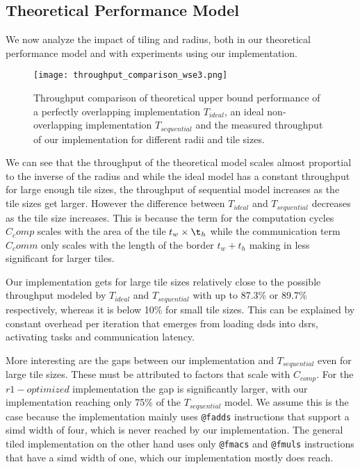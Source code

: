 \subsection{Theoretical Performance Model}
\label{sec:c}
We now analyze the impact of tiling and radius, both in our theoretical performance model and with experiments using our implementation.
\begin{figure}[h]
    \centering
    \texttt{[image: throughput\_comparison\_wse3.png]}
    \caption{Throughput comparison of theoretical upper bound performance of a perfectly overlapping implementation $T_{ideal}$, an ideal non-overlapping implementation $T_{sequential}$ and the measured throughput of our implementation for different radii and tile sizes.}
    \label{fig:throughput_comparison_wse3}
\end{figure}
We can see that the throughput of the theoretical model scales almost proportial to the inverse of the radius and while the ideal model has a constant throughput for large enough tile sizes, the throughput of sequential model increases as the tile sizes get larger.
However the difference between $T_{ideal}$ and $T_{sequential}$ decreases as the tile size increases. This is because the term for the computation cycles $C_comp$ scales with the area of the tile $t_w\times\t_h$ while the communication term $C_comm$ only scales with the length of the border $t_w+t_h$ making in less significant for larger tiles.

Our implementation gets for large tile sizes relatively close to the possible throughput modeled by $T_{ideal}$ and $T_{sequential}$ with up to 87.3\% or 89.7\% respectively, whereas it is below 10\% for small tile sizes. This can be explained by constant overhead per iteration that emerges from loading \acp{dsd} into \acp{dsr}, activating tasks and communication latency.


More interesting are the gaps between our implementation and $T_{sequential}$ even for large tile sizes. These must be attributed to factors that scale with $C_{comp}$. For the $r1-optimized$ implementation the gap is significantly larger, with our implementation reaching only 75\% of the $T_{sequential}$ model. We assume this is the case because the implementation mainly uses \texttt{@fadds} instructions that support a \ac{simd} width of four, which is never reached by our implementation. The general tiled implementation on the other hand uses only \texttt{@fmacs} and \texttt{@fmuls} instructions that have a \ac{simd} width of one, which our implementation mostly does reach.

